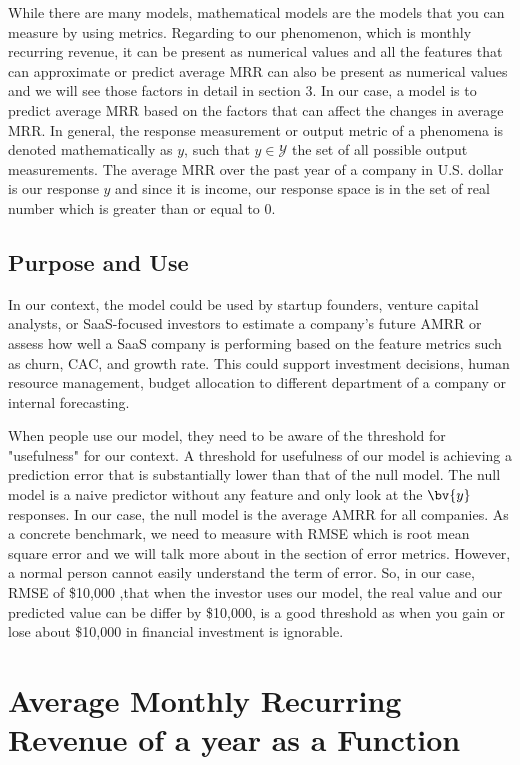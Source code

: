 \documentclass[12pt]{article}
\begin{document}
While there are many models, mathematical models are the models that you can measure by using metrics. Regarding to our phenomenon, which is monthly recurring revenue, it can be present as numerical values and all the features that can approximate or predict average MRR can also be present as numerical values and we will see those factors in detail in section 3. In our case, a model is to predict average MRR based on the factors that can affect the changes in average MRR. In general, the response measurement or output metric of a phenomena is denoted mathematically as $y$, such that $y \in \mathcal{Y}$ the set of all possible output measurements. The average MRR over the past year of a company in U.S. dollar is our response $y$ and since it is income, our response space is in the set of real number which is greater than or equal to 0. 

\subsection{Purpose and Use}

In our context, the model could be used by startup founders, venture capital analysts, or SaaS-focused investors to estimate a company's future AMRR or assess how well a SaaS company is performing based on the feature metrics such as churn, CAC, and growth rate. This could support investment decisions, human resource management, budget allocation to different department of a company or internal forecasting.

When people use our model, they need to be aware of the threshold for "usefulness" for our context. A threshold for usefulness of our model is achieving a prediction error that is substantially lower than that of the null model. The null model is a naive predictor without any feature and only look at the $\bv{y}$ responses. In our case, the null model is the average AMRR for all companies. As a concrete benchmark, we need to measure with RMSE which is root mean square error and we will talk more about in the section of error metrics. However, a normal person cannot easily understand the term of error. So, in our case, RMSE of \$10,000 ,that when the investor uses our model, the real value and our predicted value can be differ by \$10,000, is a good threshold as when you gain or lose about \$10,000 in financial investment is ignorable. 



\section{Average Monthly Recurring Revenue of a year as a Function}
\end{document}
